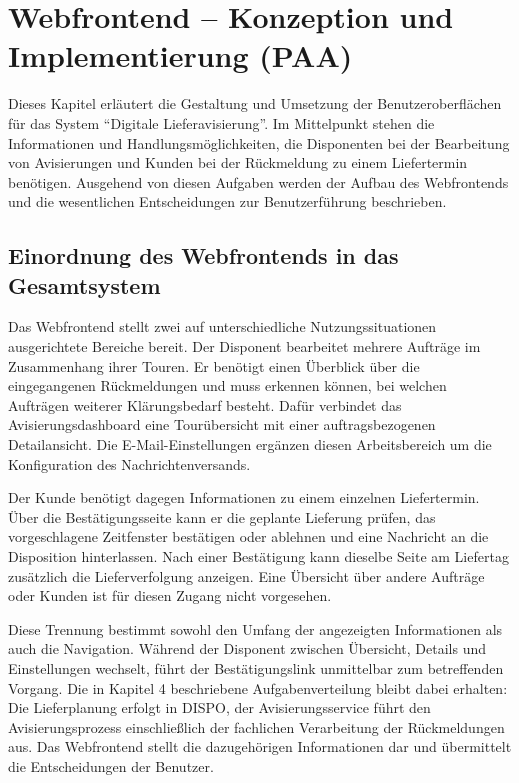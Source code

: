 \section{Webfrontend -- Konzeption und Implementierung (PAA)}
\label{sec:webfrontend}

Dieses Kapitel erläutert die Gestaltung und Umsetzung der Benutzeroberflächen für das System
\enquote{Digitale Lieferavisierung}. Im Mittelpunkt stehen die Informationen und
Handlungsmöglichkeiten, die Disponenten bei der Bearbeitung von Avisierungen und Kunden bei der
Rückmeldung zu einem Liefertermin benötigen. Ausgehend von diesen Aufgaben werden der Aufbau
des Webfrontends und die wesentlichen Entscheidungen zur Benutzerführung beschrieben.

\subsection{Einordnung des Webfrontends in das Gesamtsystem}

Das Webfrontend stellt zwei auf unterschiedliche Nutzungssituationen ausgerichtete Bereiche
bereit. Der Disponent bearbeitet mehrere Aufträge im Zusammenhang ihrer Touren. Er benötigt
einen Überblick über die eingegangenen Rückmeldungen und muss erkennen können, bei welchen
Aufträgen weiterer Klärungsbedarf besteht. Dafür verbindet das Avisierungsdashboard eine
Tourübersicht mit einer auftragsbezogenen Detailansicht. Die E-Mail-Einstellungen ergänzen
diesen Arbeitsbereich um die Konfiguration des Nachrichtenversands.

Der Kunde benötigt dagegen Informationen zu einem einzelnen Liefertermin. Über die
Bestätigungsseite kann er die geplante Lieferung prüfen, das vorgeschlagene Zeitfenster
bestätigen oder ablehnen und eine Nachricht an die Disposition hinterlassen. Nach einer
Bestätigung kann dieselbe Seite am Liefertag zusätzlich die Lieferverfolgung anzeigen. Eine
Übersicht über andere Aufträge oder Kunden ist für diesen Zugang nicht vorgesehen.

Diese Trennung bestimmt sowohl den Umfang der angezeigten Informationen als auch die
Navigation. Während der Disponent zwischen Übersicht, Details und Einstellungen wechselt, führt
der Bestätigungslink unmittelbar zum betreffenden Vorgang. Die in Kapitel 4 beschriebene
Aufgabenverteilung bleibt dabei erhalten: Die Lieferplanung erfolgt in DISPO, der
Avisierungsservice führt den Avisierungsprozess einschließlich der fachlichen Verarbeitung der
Rückmeldungen aus. Das Webfrontend stellt die dazugehörigen Informationen dar und übermittelt
die Entscheidungen der Benutzer.

